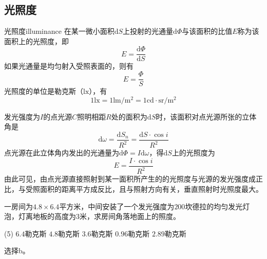 \documentclass[cn,10pt,chinesefont=founder,math=newtx,cite=super,twoside]{elegantbook}
\begin{document}
\subsection{光照度}
\begin{definition}{光照度}{illuminance}
在某一微小面积$\mathrm{d}S$上投射的光通量$\mathrm{d}\varPhi$与该面积的比值$E$称为该面积上的光照度，即
\begin{equation}
E=\frac{\mathrm{d}\varPhi}{\mathrm{d}S}
\end{equation}
如果光通量是均匀射入受照表面的，则有
\begin{equation}
E=\frac{\varPhi}{S}
\end{equation}
光照度的单位是勒克斯（$\mathrm{lx}$），有
\begin{equation}
1\mathrm{lx}=1\mathrm{lm/m^2}=1\mathrm{cd\cdot sr/m^2}
\end{equation}
\end{definition}
\begin{note}
	发光强度为$I$的点光源$C$照明相距$R$处的面积为$\mathrm{d}S$时，该面积对点光源所张的立体角是
	\begin{equation}
	\mathrm{d}\omega=\frac{\mathrm{d}S_n}{R^2}=\frac{\mathrm{d}S\cdot\cos i}{R^2}
	\end{equation}
	点光源在此立体角内发出的光通量为$\mathrm{d}\varPhi=I\mathrm{d}\omega$，得$\mathrm{d}S$上的光照度为
	\begin{equation}
	E=\frac{I\cdot\cos i}{R^2}
	\end{equation}
	由此可见，由点光源直接照射到某一面积所产生的的光照度与光源的发光强度成正比，与受照面积的距离平方成反比，且与照射方向有关，垂直照射时光照度最大。
\end{note}

\begin{problem}
	一房间为$4.8\times6.4$平方米，中间安装了一个发光强度为$200$坎德拉的均匀发光灯泡，灯离地板的高度为$3$米，求房间角落地面上的照度。  
	\begin{tasks}(5)
		\task $6.4$勒克斯
		\task $4.8$勒克斯
		\task $3.6$勒克斯
		\task $0.96$勒克斯
		\task $2.89$勒克斯
	\end{tasks}
\end{problem}
\begin{solution}
	选择b。
\end{solution}
\end{document}

